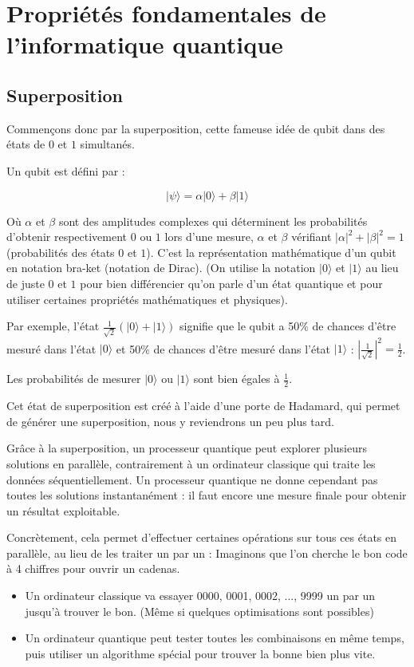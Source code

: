 \documentclass{article}
\begin{document}
\break\section{Propriétés fondamentales de l'informatique quantique}
\subsection{Superposition}
Commençons donc par la superposition, cette fameuse idée de qubit dans des états de $0$ et $1$ simultanés.

Un qubit est défini par :

\[ |\psi\rangle = \alpha|0\rangle + \beta|1\rangle \]

Où $\alpha$ et $\beta$ sont des amplitudes complexes qui déterminent les probabilités d’obtenir respectivement $0$ ou $1$ lors d’une mesure, $\alpha$ et $\beta$ vérifiant $|\alpha|^2 + |\beta|^2 = 1$ (probabilités des états $0$ et $1$).\cite{evidenCorte2024} C’est la représentation mathématique d’un qubit en notation bra-ket (notation de Dirac). (On utilise la notation $|0\rangle$ et $|1\rangle$ au lieu de juste $0$ et $1$ pour bien différencier qu’on parle d’un état quantique et pour utiliser certaines propriétés mathématiques et physiques).

Par exemple, l’état $\frac{1}{\sqrt{2}}(|0\rangle + |1\rangle)$ signifie que le qubit a 50\% de chances d’être mesuré dans l’état $|0\rangle$ et 50\% de chances d’être mesuré dans l’état $|1\rangle$ : $\left|\frac{1}{\sqrt{2}}\right|^2 = \frac{1}{2}$.

\medskip

Les probabilités de mesurer $|0\rangle$ ou $|1\rangle$ sont bien égales à $\frac{1}{2}$.

Cet état de superposition est créé à l’aide d’une porte de Hadamard, qui permet de générer une superposition, nous y reviendrons un peu plus tard.

Grâce à la superposition, un processeur quantique peut explorer plusieurs solutions en parallèle, contrairement à un ordinateur classique qui traite les données séquentiellement. Un processeur quantique ne donne cependant pas toutes les solutions instantanément : il faut encore une mesure finale pour obtenir un résultat exploitable.

Concrètement, cela permet d’effectuer certaines opérations sur tous ces états en parallèle, au lieu de les traiter un par un : Imaginons que l’on cherche le bon code à 4 chiffres pour ouvrir un cadenas.
\medskip
\begin{itemize}
    \item Un ordinateur classique va essayer 0000, 0001, 0002, ..., 9999 un par un jusqu’à trouver le bon. (Même si quelques optimisations sont possibles)
    \item Un ordinateur quantique peut tester toutes les combinaisons en même temps, puis utiliser un algorithme spécial pour trouver la bonne bien plus vite.
\end{itemize}
\end{document}
